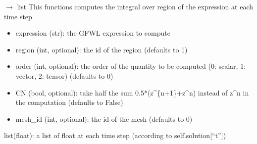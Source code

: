 \documentclass[letterpaper,10pt,english]{sphinxmanual}
\begin{document}
\begin{fulllineitems}
\begin{fulllineitems}
\end{fulllineitems}


\begin{fulllineitems}
\label{\detokenize{scrimp:scrimp.dphs.DPHS.get_quantity}}
\pysigstartsignatures
\pysiglinewithargsret
{}
{\sphinxparamcomma {}\sphinxparamcomma {}\sphinxparamcomma {}\sphinxparamcomma {}}
{{ $\rightarrow$ list}}
\pysigstopsignatures
\sphinxAtStartPar
This functions computes the integral over region of the expression
at each time step
\begin{description}
\begin{itemize}
\item {} 
\sphinxAtStartPar
expression (str): the GFWL expression to compute

\item {} 
\sphinxAtStartPar
region (int, optional): the id of the region (defaults to \sphinxhyphen{}1)

\item {} 
\sphinxAtStartPar
order (int, optional): the order of the quantity to be computed (0: scalar, 1: vector, 2: tensor) (defaults to 0)

\item {} 
\sphinxAtStartPar
CN (bool, optional): take half the sum 0.5*(z\textasciicircum{}\{n+1\}+z\textasciicircum{}n) instead of z\textasciicircum{}n in the computation (defaults to False)

\item {} 
\sphinxAtStartPar
mesh\_id (int, optional): the id of the mesh (defaults to 0)

\end{itemize}

\sphinxAtStartPar
list(float): a list of float at each time step (according to self.solution{[}“t”{]})

\end{description}

\end{fulllineitems}


\end{fulllineitems}
\end{document}
